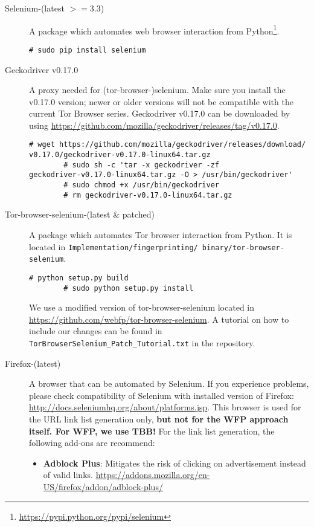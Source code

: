 \begin{description}
\item[Selenium-(latest $\mathbf{>=3.3}$)] A package which automates web browser interaction from Python\footnote{\url{https://pypi.python.org/pypi/selenium}}.\vspace{-3mm} \begin{verbatim}# sudo pip install selenium \end{verbatim}
\item[Geckodriver v0.17.0] A proxy needed for (tor-browser-)selenium. Make sure you install the v0.17.0 version; newer or older versions will not be compatible with the current Tor Browser series. Geckodriver v0.17.0 can be downloaded by using \url{https://github.com/mozilla/geckodriver/releases/tag/v0.17.0}.\vspace{-3mm} \begin{verbatim}# wget https://github.com/mozilla/geckodriver/releases/download/
v0.17.0/geckodriver-v0.17.0-linux64.tar.gz 
		# sudo sh -c 'tar -x geckodriver -zf 
geckodriver-v0.17.0-linux64.tar.gz -O > /usr/bin/geckodriver'
		# sudo chmod +x /usr/bin/geckodriver
		# rm geckodriver-v0.17.0-linux64.tar.gz \end{verbatim}
\item[Tor-browser-selenium-(latest \& patched)] A package which automates Tor browser interaction from Python. It is located in \texttt{Implementation/fingerprinting/ binary/tor-browser-selenium}.\vspace{-3mm} \begin{verbatim}# python setup.py build 
		# sudo python setup.py install \end{verbatim}
We use a modified version of tor-browser-selenium located in \url{https://github.com/webfp/tor-browser-selenium}. A tutorial on how to include our changes can be found in \texttt{TorBrowserSelenium\_Patch\_Tutorial.txt} in the repository.
\item[Firefox-(latest)] A browser that can be automated by Selenium. If you experience problems, please check compatibility of Selenium with installed version of Firefox: \url{http://docs.seleniumhq.org/about/platforms.jsp}. This browser is used for the \ac{URL} link list generation only, \textbf{but not for the \ac{WFP} approach itself. For \ac{WFP}, we use \ac{TBB}!} For the link list generation, the following add-ons are recommend:
\begin{itemize}
\item \textbf{Adblock Plus}: Mitigates the risk of clicking on advertisement instead of valid links. \url{https://addons.mozilla.org/en-US/firefox/addon/adblock-plus/}

\end{itemize}
\end{description}
